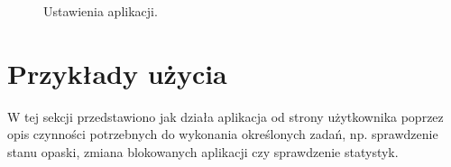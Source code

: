 \begin{figure}[H]
    \begin{center}
        \setlength{\fboxsep}{0pt}%
        \setlength{\fboxrule}{0.3pt}%
    \end{center}
    \caption{{\color{dgray}Ustawienia aplikacji.}} \label{Settings}
\end{figure}

\section{Przykłady użycia}
W tej sekcji przedstawiono jak działa aplikacja od strony użytkownika poprzez opis czynności potrzebnych do wykonania określonych zadań, np. sprawdzenie stanu opaski, zmiana blokowanych aplikacji czy sprawdzenie statystyk.
